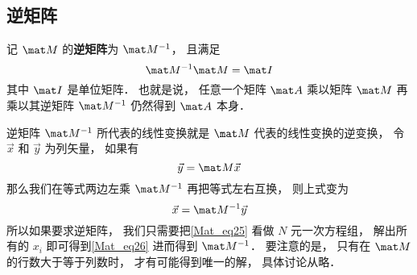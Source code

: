 \subsection{逆矩阵}
记 $\mat M$ 的\textbf{逆矩阵}为 $\mat M^{-1}$， 且满足
\begin{equation}
\mat M^{-1} \mat M = \mat I
\end{equation}
其中 $\mat I$ 是单位矩阵． 也就是说， 任意一个矩阵 $\mat A$ 乘以矩阵 $\mat M$ 再乘以其逆矩阵 $\mat M^{-1}$ 仍然得到 $\mat A$ 本身． 

逆矩阵 $\mat M^{-1}$ 所代表的线性变换就是 $\mat M$ 代表的线性变换的逆变换， 令 $\vec x$ 和 $\vec y$ 为列矢量， 如果有
\begin{equation}\label{Mat_eq25}
\vec y = \mat M \vec x
\end{equation}
那么我们在等式两边左乘 $\mat M^{-1}$ 再把等式左右互换， 则上式变为
\begin{equation}\label{Mat_eq26}
\vec x = \mat M^{-1} \vec y
\end{equation}
所以如果要求逆矩阵， 我们只需要把\autoref{Mat_eq25} 看做 $N$ 元一次方程组， 解出所有的 $x_i$ 即可得到\autoref{Mat_eq26} 进而得到 $\mat M^{-1}$． 要注意的是， 只有在 $\mat M$ 的行数大于等于列数时， 才有可能得到唯一的解， 具体讨论从略．






